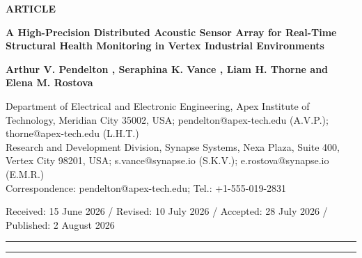 \documentclass[10pt,a4paper]{article}
\begin{document}
\noindent{}
\vspace{0.8em}



\begin{center}
  \vspace*{10pt}
  {\sffamily\small\bfseries\color{mdpiPrimary} ARTICLE}\par
  \vspace{15pt}
  {\LARGE\bfseries\sffamily\color{mdpiPrimary} A High-Precision Distributed Acoustic Sensor Array for Real-Time Structural Health Monitoring in Vertex Industrial Environments}\par
  \vspace{20pt}
  {\large\sffamily\bfseries 
    Arthur V. Pendelton , 
    Seraphina K. Vance , 
    Liam H. Thorne  and 
    Elena M. Rostova 
  }\par
  \vspace{12pt}
  {\small\sffamily\color{mdpiSecondary}
     Department of Electrical and Electronic Engineering, Apex Institute of Technology, Meridian City 35002, USA; pendelton@apex-tech.edu (A.V.P.); thorne@apex-tech.edu (L.H.T.)\\
     Research and Development Division, Synapse Systems, Nexa Plaza, Suite 400, Vertex City 98201, USA; s.vance@synapse.io (S.K.V.); e.rostova@synapse.io (E.M.R.)\\
    \text{*} Correspondence: pendelton@apex-tech.edu; Tel.: +1-555-019-2831
  }\par
  \vspace{12pt}
  {\small\sffamily\color{mdpiSecondary} Received: 15 June 2026 / Revised: 10 July 2026 / Accepted: 28 July 2026 / Published: 2 August 2026}
\end{center}

\vspace{10pt}
\hrule
\vspace{15pt}



\vspace{15pt}
\hrule
\vspace{20pt}







\clearpage
\printbibliography
\end{document}
